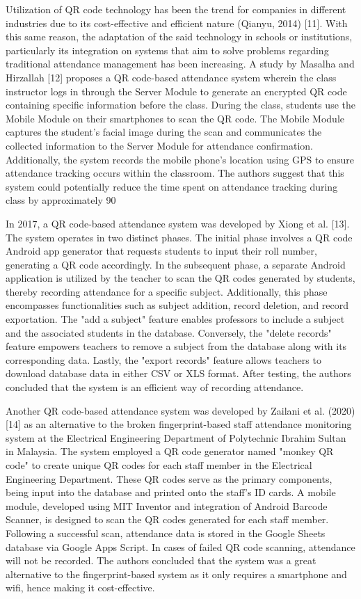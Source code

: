 \documentclass[journal]{./IEEE/IEEEtran}
\begin{document}
Utilization of QR code technology has been the trend for companies in different industries due to its cost-effective and efficient nature (Qianyu, 2014) [11]. With this same reason, the adaptation of the said technology in schools or institutions, particularly its integration on systems that aim to solve problems regarding traditional attendance management has been increasing. A study by Masalha and Hirzallah [12] proposes a QR code-based attendance system wherein the class instructor logs in through the Server Module to generate an encrypted QR code containing specific information before the class. During the class, students use the Mobile Module on their smartphones to scan the QR code. The Mobile Module captures the student's facial image during the scan and communicates the collected information to the Server Module for attendance confirmation. Additionally, the system records the mobile phone's location using GPS to ensure attendance tracking occurs within the classroom. The authors suggest that this system could potentially reduce the time spent on attendance tracking during class by approximately 90%

In 2017, a QR code-based attendance system was developed by Xiong et al. [13]. The system operates in two distinct phases. The initial phase involves a QR code Android app generator that requests students to input their roll number, generating a QR code accordingly. In the subsequent phase, a separate Android application is utilized by the teacher to scan the QR codes generated by students, thereby recording attendance for a specific subject. Additionally, this phase encompasses functionalities such as subject addition,  record deletion, and record exportation. The "add a subject" feature enables professors to include a subject and the associated students in the database. Conversely, the "delete records" feature empowers teachers to remove a subject from the database along with its corresponding data. Lastly, the "export records" feature allows teachers to download database data in either CSV or XLS format. After testing, the authors concluded that the system is an efficient way of recording attendance. 

Another QR code-based attendance system was developed by Zailani et al. (2020) [14] as an alternative to the broken fingerprint-based staff attendance monitoring system at the Electrical Engineering Department of Polytechnic Ibrahim Sultan in Malaysia. The system employed a QR code generator named "monkey QR code" to create unique QR codes for each staff member in the Electrical Engineering Department. These QR codes serve as the primary components, being input into the database and printed onto the staff's ID cards. A mobile module, developed using MIT Inventor and integration of Android Barcode Scanner, is designed to scan the QR codes generated for each staff member. Following a successful scan, attendance data is stored in the Google Sheets database via Google Apps Script. In cases of failed QR code scanning, attendance will not be recorded. The authors concluded that the system was a great alternative to the fingerprint-based system as it only requires a smartphone and wifi, hence making it cost-effective. 
\end{document}

